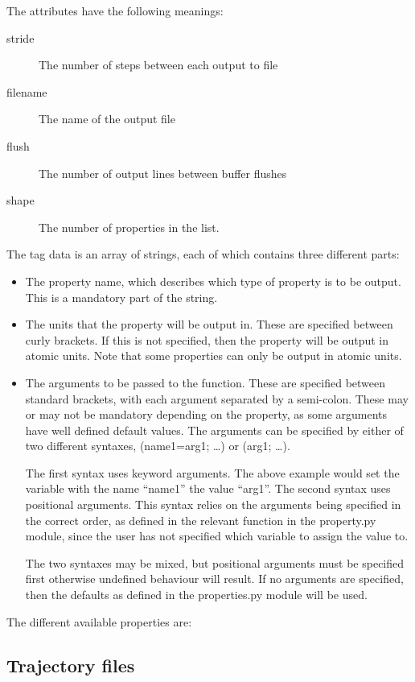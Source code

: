 \documentclass[11pt,english,fleqn]{report}
\begin{document}
The attributes have the following meanings:
\begin{description}
\item [{stride}] The number of steps between each output to file
\item [{filename}] The name of the output file
\item [{flush}] The number of output lines between buffer flushes
\item [{shape}] The number of properties in the list.
\end{description}
The tag data is an array of strings, each of which contains three
different parts:
\begin{itemize}
\item The property name, which describes which type of property is to be
output. This is a mandatory part of the string.
\item The units that the property will be output in. These are specified
between curly brackets. If this is not specified, then the property
will be output in atomic units. Note that some properties can only
be output in atomic units.
\item The arguments to be passed to the function. These are specified between
standard brackets, with each argument separated by a semi-colon. These
may or may not be mandatory depending on the property, as some arguments
have well defined default values. The arguments
can be specified by either of two different syntaxes, (name1=arg1;
\ldots ) or (arg1; \ldots ).

The first syntax uses keyword arguments. The above example would set the variable
with the name {}``name1'' the value {}``arg1''.
The second syntax uses positional arguments. This syntax
relies on the arguments being specified in the correct order, as defined
in the relevant function in the property.py module, since the user has
not specified which variable to assign the value to.

The two syntaxes
may be mixed, but positional arguments must be specified first otherwise
undefined behaviour will result. If no arguments are specified, then
the defaults as defined in the properties.py module will be used.
\end{itemize}
The different available properties are:



\subsection{Trajectory files} \label{trajectories}
\end{document}
